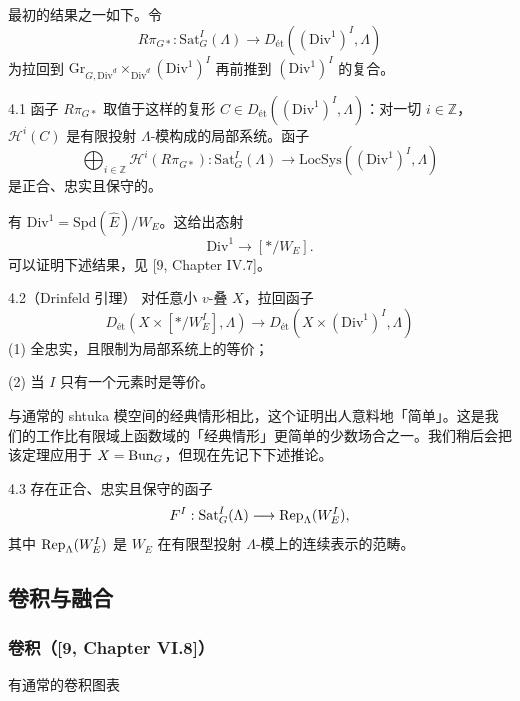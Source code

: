 最初的结果之一如下。令
\[
R\pi_{G*}:\mathrm{Sat}^I_G(\Lambda)\longrightarrow D_{\text{ét}}((\mathrm{Div}^1)^I,\Lambda)
\]
为拉回到 $\mathrm{Gr}_{G,\mathrm{Div}^d}\times_{\mathrm{Div}^d}(\mathrm{Div}^1)^I$ 再前推到 $(\mathrm{Div}^1)^I$ 的复合。
\begin{thm}{4.1}
函子 $R\pi_{G*}$ 取值于这样的复形 $C\in D_{\text{ét}}((\mathrm{Div}^1)^I,\Lambda)$：对一切 $i\in\mathbb Z$，$\mathcal H^i(C)$ 是有限投射 $\Lambda$-模构成的局部系统。函子
\[
\bigoplus_{i\in\mathbb Z}\mathcal H^i(R\pi_{G*}):\mathrm{Sat}^I_G(\Lambda)\longrightarrow\mathrm{LocSys}((\mathrm{Div}^1)^I,\Lambda)
\]
是正合、忠实且保守的。\label{thm:a3-4-1}
\end{thm}

有 $\mathrm{Div}^1=\mathrm{Spd}(\widehat E)/W_E$。这给出态射
\[
\mathrm{Div}^1\longrightarrow[*/W_E].
\]
可以证明下述结果，见 [9, Chapter IV.7]。
\begin{thm}{4.2（Drinfeld 引理）}
对任意小 $v$-叠 $X$，拉回函子
\[
D_{\text{ét}}(X\times[*/W^I_E],\Lambda)\longrightarrow D_{\text{ét}}(X\times(\mathrm{Div}^1)^I,\Lambda)
\]
(1) 全忠实，且限制为局部系统上的等价；

(2) 当 $I$ 只有一个元素时是等价。\label{thm:a3-4-2}
\end{thm}

与通常的 shtuka 模空间的经典情形相比，这个证明出人意料地「简单」。这是我们的工作比有限域上函数域的「经典情形」更简单的少数场合之一。我们稍后会把该定理应用于 $X=\operatorname{Bun}_G$，但现在先记下下述推论。
\begin{cor}{4.3}
存在正合、忠实且保守的函子
\[
F^I:\mathrm{Sat}^I_G(\Lambda)\longrightarrow\operatorname{Rep}_\Lambda(W^I_E),
\]
其中 $\operatorname{Rep}_\Lambda(W^I_E)$ 是 $W_E$ 在有限型投射 $\Lambda$-模上的连续表示的范畴。\label{cor:a3-4-3}
\end{cor}

\subsection{卷积与融合}

\subsubsection{卷积（[9, Chapter VI.8]）}

有通常的卷积图表
\begin{center}
\end{center}
